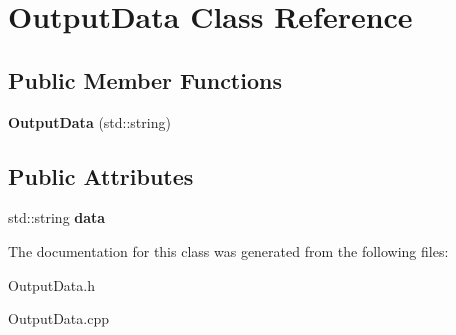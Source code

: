 \hypertarget{class_output_data}{}\section{Output\+Data Class Reference}
\label{class_output_data}
\subsection*{Public Member Functions}
\begin{DoxyCompactItemize}
\item 
\mbox{\label{class_output_data_a66eec456c0579b9945a412bb919f8f08}} 
{\bfseries Output\+Data} (std\+::string)
\end{DoxyCompactItemize}
\subsection*{Public Attributes}
\begin{DoxyCompactItemize}
\item 
\mbox{\label{class_output_data_aea2c1c5aff5523a159a410ff0e06b6fa}} 
std\+::string {\bfseries data}
\end{DoxyCompactItemize}


The documentation for this class was generated from the following files\+:\begin{DoxyCompactItemize}
\item 
Output\+Data.\+h\item 
Output\+Data.\+cpp\end{DoxyCompactItemize}
